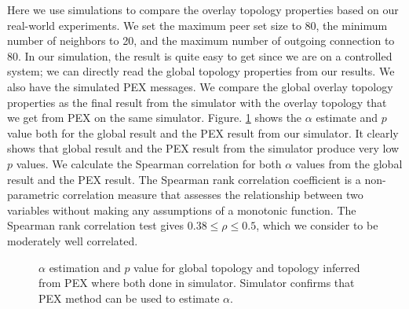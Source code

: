 \documentclass[10pt,conference,letterpaper]{IEEEtran}
\begin{document}
Here we use simulations to compare the overlay topology properties based  on our real-world experiments. 
We set the maximum peer set size to 80, the minimum number of neighbors to 20, and the maximum number of outgoing connection to 80. In our simulation, the result is quite easy to get since we are on a controlled system;  we can directly read the  global topology properties from our results. 
We also have the simulated PEX messages. We compare the global overlay topology properties as the final result from the simulator with the overlay topology that we get from PEX on the same simulator.
Figure. \ref{fig:simulation} shows the $\alpha$ estimate and $p$ value both for the global result and the PEX result from our simulator. 
It clearly shows that global result and the PEX result from the simulator produce very low $p$ values. 
We calculate the Spearman correlation for both $\alpha$ values from the global result and the PEX result. 
The Spearman rank correlation coefficient is a non-parametric correlation measure that assesses the relationship between two variables
without making any assumptions of a monotonic function.
The Spearman rank correlation test gives $0.38 \leq \rho \leq 0.5$, which we consider to be moderately well correlated. 

\begin{figure}
\centering
{}
\caption{$\alpha$ estimation and $p$ value for global topology and topology inferred from PEX where both done in simulator.
Simulator confirms that PEX method can be used to estimate $\alpha$.} 
\label{fig:simulation}
\end{figure}
\end{document}
